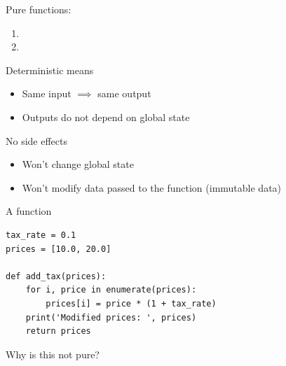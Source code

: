 \begin{frame}
    
    Pure functions:

    \begin{enumerate}
        \item {}
        \vspace{0.5em}
        \item {}
    \end{enumerate}


    Deterministic means

    \begin{itemize}
        \item Same input $\implies$ same output 
        \vspace{0.5em}
        \item Outputs do not depend on global state
    \end{itemize}


    No side effects

    \begin{itemize}
        \item Won't change global state
        \vspace{0.5em}
        \item Won't modify data passed to the function (immutable data)
    \end{itemize}

\end{frame}


\begin{frame}[fragile]

    A  function
    \vspace{0.5em}
    \vspace{0.5em}

    \begin{verbatim}
tax_rate = 0.1 
prices = [10.0, 20.0] 

def add_tax(prices):
    for i, price in enumerate(prices):
        prices[i] = price * (1 + tax_rate)    
    print('Modified prices: ', prices)
    return prices
    \end{verbatim}

    \vspace{0.5em}
    \vspace{0.5em}
    \vspace{0.5em}
    Why is this not pure?
    
\end{frame}



